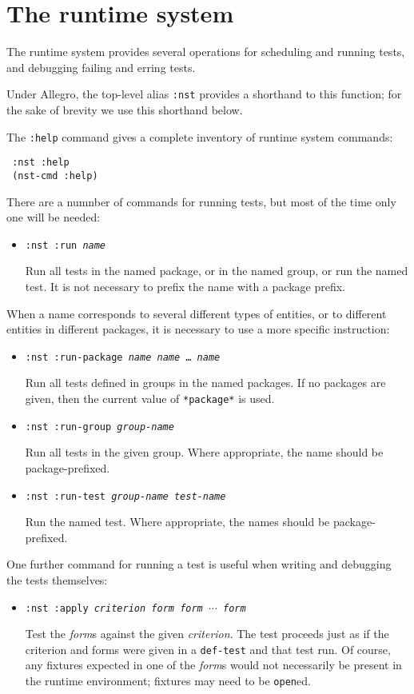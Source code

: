 \section{The runtime system}
The runtime system provides several operations for scheduling and
running tests, and debugging failing and erring tests.
 
Under Allegro, the top-level alias
\texttt{:nst} provides a shorthand to this
function; for the sake of brevity we use this shorthand below.

The \texttt{:help} command gives a complete inventory of runtime
system commands:
\begin{verbatim}
 :nst :help
 (nst-cmd :help)
\end{verbatim}

There are a numnber of commands for running tests, but most of the
time only one will be needed:
\begin{itemize}
\item\texttt{:nst :run {\itshape name}}
  \par Run all tests in the named package, or in the named group, or
  run the named test.  It is not necessary to prefix the name with a
  package prefix.
\end{itemize}
When a name corresponds to several different types of entities, or to
different entities in different packages, it is necessary to use a
more specific instruction:
\begin{itemize}
\item\texttt{:nst :run-package {\itshape name} {\itshape name} \ldots\ {\itshape name}}
  \par Run all tests defined in groups in the named packages.  If no
  packages are given, then the current value of \texttt{*package*} is
  used.
\item\texttt{:nst :run-group {\itshape group-name}}
  \par Run all tests in the given group.  Where appropriate, the name
  should be package-prefixed.
\item\texttt{:nst :run-test {\itshape group-name} {\itshape test-name}}
  \par Run the named test.  Where appropriate, the names should be
  package-prefixed.
\end{itemize}
One further command for running a test is useful when writing and
debugging the tests themselves:
\begin{itemize}
\item\texttt{:nst :apply {\itshape criterion} {\itshape form} {\itshape form} $\cdots$ {\itshape form}}
  \par Test the {\itshape form}s against the given {\itshape
    criterion}.  The test proceeds just as if the criterion and forms
  were given in a \texttt{def-test} and that test run.  Of course, any
  fixtures expected in one of the {\itshape form}s would not
  necessarily be present in the runtime environment; fixtures may need
  to be \texttt{open}ed.
\end{itemize}

